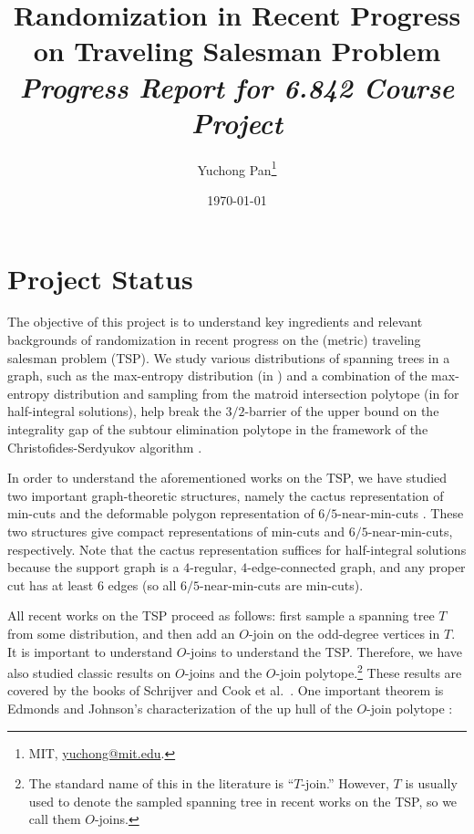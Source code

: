 \documentclass[letterpaper, reqno,12pt]{article}
\begin{document}
\title{\Large Randomization in Recent Progress on Traveling Salesman Problem \\ {\large \em Progress Report for 6.842 Course Project}}
\author{Yuchong Pan\thanks{MIT, \href{mailto:yuchong@mit.edu}{yuchong@mit.edu}.}}
\date{\today}
\newtheorem{theorem}{Theorem}
\newtheorem{lemma}[theorem]{Lemma}
\newtheorem{corollary}[theorem]{Corollary}
\theoremstyle{definition} \newtheorem{definition}[theorem]{Definition}
\maketitle
%

\section{Project Status}

The objective of this project is to understand key ingredients and relevant backgrounds of randomization in recent progress on the (metric) traveling salesman problem (TSP). We study various distributions of spanning trees in a graph, such as the max-entropy distribution (in \cite{karlin2021slightly,karlin2021slightlyig}) and a combination of the max-entropy distribution and sampling from the matroid intersection polytope (in \cite{gupta2021matroid} for half-integral solutions), help break the $3/2$-barrier of the upper bound on the integrality gap of the subtour elimination polytope in the framework of the Christofides-Serdyukov algorithm \cite{christofides1976worst,serdyukov1978nekotorykh}.

In order to understand the aforementioned works on the TSP, we have studied two important graph-theoretic structures, namely the cactus representation of min-cuts \cite{dinits1976structure,nagamochi1994canonical} and the deformable polygon representation of $6/5$-near-min-cuts \cite{benczur1995structure,benczur1995representation,benczur1997cut, benczur2008deformable}. These two structures give compact representations of min-cuts and $6/5$-near-min-cuts, respectively. Note that the cactus representation suffices for half-integral solutions because the support graph is a $4$-regular, $4$-edge-connected graph, and any proper cut has at least $6$ edges (so all $6/5$-near-min-cuts are min-cuts).

All recent works on the TSP proceed as follows: first sample a spanning tree $T$ from some distribution, and then add an $O$-join on the odd-degree vertices in $T$. It is important to understand $O$-joins to understand the TSP. Therefore, we have also studied classic results on $O$-joins and the $O$-join polytope.\footnote{The standard name of this in the literature is ``$T$-join.'' However, $T$ is usually used to denote the sampled spanning tree in recent works on the TSP, so we call them $O$-joins.} These results are covered by the books of Schrijver \cite{schrijver2003combinatorial} and Cook et al.\ \cite{cook2009combinatorial}. One important theorem is Edmonds and Johnson's characterization of the up hull of the $O$-join polytope \cite{edmonds1973matching}:
\end{document}

